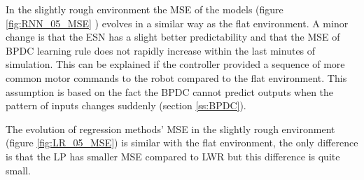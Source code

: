 \documentclass[msc,ai,logo]{infthesis}
\begin{document}
In the slightly rough environment the MSE of the models (figure \ref{fig:RNN_05_MSE} ) evolves in a similar way as the flat environment. A minor change is that the ESN has a slight better predictability and that the MSE of BPDC learning rule does not rapidly increase within the last minutes of simulation. This can be explained if the controller provided a sequence of more common motor commands to the robot compared to the flat environment. This assumption is based on the fact the BPDC cannot predict outputs when the pattern of inputs changes suddenly (section \ref{ss:BPDC}). 

The evolution of regression methods' MSE in the slightly rough environment (figure \ref{fig:LR_05_MSE}) is similar with the flat environment, the only difference is that the LP has smaller MSE compared to LWR but this difference is quite small.       
\end{document}
